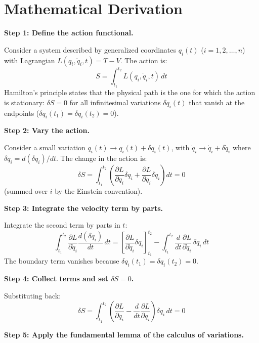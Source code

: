 \section*{Mathematical Derivation}

\textbf{Step 1: Define the action functional.}

Consider a system described by generalized coordinates $q_i(t)$ ($i = 1, 2, \ldots, n$) with Lagrangian $L(q_i, \dot{q}_i, t) = T - V$. The action is:
\begin{equation}
S = \int_{t_1}^{t_2} L(q_i, \dot{q}_i, t)\, dt
\end{equation}
Hamilton's principle states that the physical path is the one for which the action is stationary: $\delta S = 0$ for all infinitesimal variations $\delta q_i(t)$ that vanish at the endpoints ($\delta q_i(t_1) = \delta q_i(t_2) = 0$).

\textbf{Step 2: Vary the action.}

Consider a small variation $q_i(t) \to q_i(t) + \delta q_i(t)$, with $\dot{q}_i \to \dot{q}_i + \delta\dot{q}_i$ where $\delta\dot{q}_i = d(\delta q_i)/dt$. The change in the action is:
\begin{equation}
\delta S = \int_{t_1}^{t_2}\left(\frac{\partial L}{\partial q_i}\delta q_i + \frac{\partial L}{\partial \dot{q}_i}\delta\dot{q}_i\right) dt = 0
\end{equation}
(summed over $i$ by the Einstein convention).

\textbf{Step 3: Integrate the velocity term by parts.}

Integrate the second term by parts in $t$:
\begin{equation}
\int_{t_1}^{t_2}\frac{\partial L}{\partial \dot{q}_i}\frac{d(\delta q_i)}{dt}\, dt = \left[\frac{\partial L}{\partial \dot{q}_i}\delta q_i\right]_{t_1}^{t_2} - \int_{t_1}^{t_2}\frac{d}{dt}\frac{\partial L}{\partial \dot{q}_i}\,\delta q_i\, dt
\end{equation}
The boundary term vanishes because $\delta q_i(t_1) = \delta q_i(t_2) = 0$.

\textbf{Step 4: Collect terms and set $\delta S = 0$.}

Substituting back:
\begin{equation}
\delta S = \int_{t_1}^{t_2}\left(\frac{\partial L}{\partial q_i} - \frac{d}{dt}\frac{\partial L}{\partial \dot{q}_i}\right)\delta q_i\, dt = 0
\end{equation}

\textbf{Step 5: Apply the fundamental lemma of the calculus of variations.}

